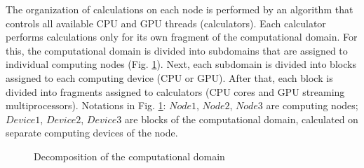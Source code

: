 \documentclass{svproc}
\begin{document}
The organization of calculations on each node is performed by an algorithm that controls all available CPU and GPU threads (calculators).
Each calculator performs calculations only for its own fragment of the computational domain.
For this, the computational domain is divided into subdomains that are assigned to individual computing nodes (Fig. \ref{fig1}).
Next, each subdomain is divided into blocks assigned to each computing device (CPU or GPU).
After that, each block is divided into fragments assigned to calculators (CPU cores and GPU streaming multiprocessors). 
Notations in Fig. \ref{fig1}: $Node1$, $Node2$, $Node3$ are computing nodes;
$Device1$, $Device2$, $Device3$ are blocks of the computational domain, calculated on separate computing devices of the node. 

\begin{figure}[h!]
	\caption{Decomposition of the computational domain} \label{fig1}
\end{figure}
\end{document}
